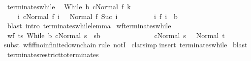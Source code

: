 \begin{isabellebody}
\isadelimproof
\isanewline
%
\endisadelimproof
\isanewline
{}\isamarkupfalse%
\ terminates{\isacharunderscore}while{\isacharcolon}\isanewline
\ \ {\isachardoublequoteopen}{\isasymlbrakk}{\isasymGamma}{\isasymturnstile}{\isacharparenleft}While\ b\ c{\isacharparenright}{\isasymdown}Normal\ {\isacharparenleft}f\ k{\isacharparenright}{\isacharsemicolon}\ \ \isanewline
\ \ \ \ {\isasymforall}i{\isachardot}\ {\isasymGamma}{\isasymturnstile}{\isasymlangle}c{\isacharcomma}Normal\ {\isacharparenleft}f\ i{\isacharparenright}\ {\isasymrangle}\ {\isasymRightarrow}\ Normal\ {\isacharparenleft}f\ {\isacharparenleft}Suc\ i{\isacharparenright}{\isacharparenright}{\isasymrbrakk}\isanewline
\ \ \ \ \ \ \ \ \ {\isasymLongrightarrow}\ {\isasymexists}i{\isachardot}\ f\ i\ {\isasymnotin}\ b{\isachardoublequoteclose}\isanewline
%
\isadelimproof
\ \ %
\endisadelimproof
%
\isatagproof
{}\isamarkupfalse%
\ {\isacharparenleft}blast\ intro{\isacharcolon}\ terminates{\isacharunderscore}while{\isacharunderscore}lemma{\isacharparenright}%
\endisatagproof
{\isafoldproof}%
%
\isadelimproof
\isanewline
%
\endisadelimproof
\isanewline
{}\isamarkupfalse%
\ wf{\isacharunderscore}terminates{\isacharunderscore}while{\isacharcolon}\ \isanewline
\ {\isachardoublequoteopen}wf\ {\isacharbraceleft}{\isacharparenleft}t{\isacharcomma}s{\isacharparenright}{\isachardot}\ {\isasymGamma}{\isasymturnstile}{\isacharparenleft}While\ b\ c{\isacharparenright}{\isasymdown}Normal\ s\ {\isasymand}\ s{\isasymin}b\ {\isasymand}\ \isanewline
\ \ \ \ \ \ \ \ \ \ \ \ \ {\isasymGamma}{\isasymturnstile}{\isasymlangle}c{\isacharcomma}Normal\ s\ {\isasymrangle}\ {\isasymRightarrow}\ Normal\ t{\isacharbraceright}{\isachardoublequoteclose}\isanewline
%
\isadelimproof
%
\endisadelimproof
%
\isatagproof
{}\isamarkupfalse%
{\isacharparenleft}subst\ wf{\isacharunderscore}iff{\isacharunderscore}no{\isacharunderscore}infinite{\isacharunderscore}down{\isacharunderscore}chain{\isacharparenright}\isanewline
{}\isamarkupfalse%
{\isacharparenleft}rule\ notI{\isacharparenright}\isanewline
{}\isamarkupfalse%
\ clarsimp\isanewline
{}\isamarkupfalse%
{\isacharparenleft}insert\ terminates{\isacharunderscore}while{\isacharparenright}\isanewline
{}\isamarkupfalse%
\ blast\isanewline
{}\isamarkupfalse%
%
\endisatagproof
{\isafoldproof}%
%
\isadelimproof
\isanewline
%
\endisadelimproof
\isanewline
{}\isamarkupfalse%
\ terminates{\isacharunderscore}restrict{\isacharunderscore}to{\isacharunderscore}terminates{\isacharcolon}\isanewline

\end{isabellebody}
